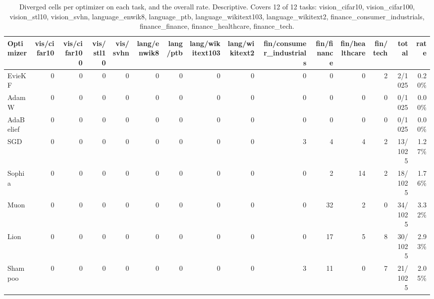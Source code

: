 \begin{table}[t]
\centering
\small
\caption{Diverged cells per optimizer on each task, and the overall rate. Descriptive. Covers 12 of 12 tasks: vision\_cifar10, vision\_cifar100, vision\_stl10, vision\_svhn, language\_enwik8, language\_ptb, language\_wikitext103, language\_wikitext2, finance\_consumer\_industrials, finance\_finance, finance\_healthcare, finance\_tech.}
\label{tab:table9c_divergence_rate}
\begin{tabular}{lrrrrrrrrrrrrrr}
\toprule
Optimizer & vis/cifar10 & vis/cifar100 & vis/stl10 & vis/svhn & lang/enwik8 & lang/ptb & lang/wikitext103 & lang/wikitext2 & fin/consumer\_industrials & fin/finance & fin/healthcare & fin/tech & total & rate \\
\midrule
EvieKF & 0 & 0 & 0 & 0 & 0 & 0 & 0 & 0 & 0 & 0 & 0 & 2 & 2/1025 & 0.20\% \\
AdamW & 0 & 0 & 0 & 0 & 0 & 0 & 0 & 0 & 0 & 0 & 0 & 0 & 0/1025 & 0.00\% \\
AdaBelief & 0 & 0 & 0 & 0 & 0 & 0 & 0 & 0 & 0 & 0 & 0 & 0 & 0/1025 & 0.00\% \\
SGD & 0 & 0 & 0 & 0 & 0 & 0 & 0 & 0 & 3 & 4 & 4 & 2 & 13/1025 & 1.27\% \\
Sophia & 0 & 0 & 0 & 0 & 0 & 0 & 0 & 0 & 0 & 2 & 14 & 2 & 18/1025 & 1.76\% \\
Muon & 0 & 0 & 0 & 0 & 0 & 0 & 0 & 0 & 0 & 32 & 2 & 0 & 34/1025 & 3.32\% \\
Lion & 0 & 0 & 0 & 0 & 0 & 0 & 0 & 0 & 0 & 17 & 5 & 8 & 30/1025 & 2.93\% \\
Shampoo & 0 & 0 & 0 & 0 & 0 & 0 & 0 & 0 & 3 & 11 & 0 & 7 & 21/1025 & 2.05\% \\
\bottomrule
\end{tabular}
\end{table}

